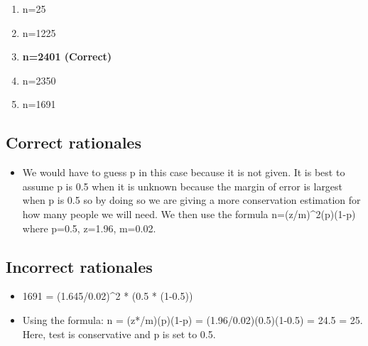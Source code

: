\documentclass[letterpaper,9pt,twoside,printwatermark=false]{pinp}
\providecommand{\tightlist}{%
  \setlength{\itemsep}{0pt}\setlength{\parskip}{0pt}}
\begin{document}
\begin{enumerate}
\def\labelenumi{\alph{enumi}.}
\tightlist
\item
  n=25
\item
  n=1225
\item
  \textbf{n=2401 (Correct)}
\item
  n=2350
\item
  n=1691
\end{enumerate}

\hypertarget{correct-rationales-15}{%
\subsection{Correct rationales}\label{correct-rationales-15}}

\begin{itemize}
\tightlist
\item
  We would have to guess p in this case because it is not given. It is
  best to assume p is 0.5 when it is unknown because the margin of error
  is largest when p is 0.5 so by doing so we are giving a more
  conservation estimation for how many people we will need. We then use
  the formula n=(z/m)\^{}2(p)(1-p) where p=0.5, z=1.96, m=0.02.
\end{itemize}

\hypertarget{incorrect-rationales-15}{%
\subsection{Incorrect rationales}\label{incorrect-rationales-15}}

\begin{itemize}
\tightlist
\item
  1691 = (1.645/0.02)\^{}2 * (0.5 * (1-0.5))
\item
  Using the formula: n = (z*/m)(p)(1-p) = (1.96/0.02)(0.5)(1-0.5) = 24.5
  = 25. Here, test is conservative and p is set to 0.5.
\end{itemize}





\end{document}
